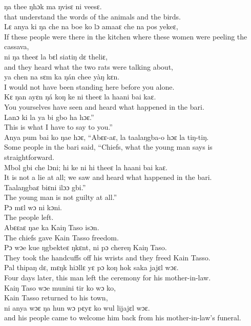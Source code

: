 ŋa thee ŋhɔk ma ŋvisɛ ni veesɛ.\\
that understand the words of the animals and the birds.\\

Lɛ anya ki ŋa che na boe ko lɔ amaaɛ che na pos yekeɛ,\\ 
If these people were there in the kitchen where these women were peeling the cassava,\\ 

ni ŋa theeɛ la bɛl siatiŋ dɛ theliɛ,\\
and they heard what the two rats were talking about,\\

ya chen na sɛm ka ŋán chee yàŋ kɛn.\\
I would not have been standing here before you alone.\\

Kɛ ŋan ayɛn ŋá koŋ ke ni theeɛ la haani bai kaɛ.\\
You yourselves have seen and heard what happened in the bari.\\

Lanɔ ki la ya bi gbo ha hɔɛ.”\\
This is what I have to say to you.”\\

Anya pum bai ko ŋae hɔɛ, “Abɛɛ-aɛ, la taalaŋgba-o hɔɛ la tiŋ-tiŋ.\\
Some people in the bari said, “Chiefs, what the young man says is straightforward.\\

Mbol gbi che lɔni; hi ke ni hi theeɛ la haani bai kaɛ.\\
It is not a lie at all; we saw and heard what happened in the bari.\\

Taalaŋgbaɛ biɛni ilɔɔ gbi.”\\
The young man is not guilty at all.”\\

Pɔ mɛl wɔ ni kɔni.\\
The people left.\\

Abɛɛaɛ ŋae ka Kaiŋ Taso isɔn.\\
The chiefs gave Kain Tasso freedom.\\

Pɔ wɔe kue ŋgbekteɛ ŋkɛnt, ni pɔ chereŋ Kaiŋ Taso.\\
They took the handcuffs off his wrists and they freed Kain Tasso.\\

Pal thipaŋ dɛ, mɛŋk hiɔllɛ yɛ pɔ koŋ hok saka jajɛl wɔɛ.\\
Four days later, this man left the ceremony for his mother-in-law.\\

Kaiŋ Taso wɔe munini tir ko wɔ ko,\\
Kain Tasso returned to his town,\\ 

ni anya wɔɛ ŋa hun wɔ pɛyɛ ko wul lijajɛl wɔɛ.\\
and his people came to welcome him back from his mother-in-law’s funeral.\\
